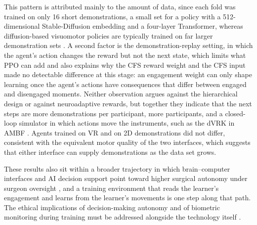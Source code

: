 \documentclass[utf8]{frontiers_suppmat}
\begin{document}
This pattern is attributed mainly to the amount of data, since each fold was trained on only 16 short demonstrations, a small set for a policy with a 512-dimensional Stable-Diffusion embedding and a four-layer Transformer, whereas diffusion-based visuomotor policies are typically trained on far larger demonstration sets \cite{chi2023diffusion,kim2024srt}. A second factor is the demonstration-replay setting, in which the agent's action changes the reward but not the next state, which limits what PPO can add and also explains why the CFS reward weight and the CFS input made no detectable difference at this stage: an engagement weight can only shape learning once the agent's actions have consequences that differ between engaged and disengaged moments. Neither observation argues against the hierarchical design or against neuroadaptive rewards, but together they indicate that the next steps are more demonstrations per participant, more participants, and a closed-loop simulator in which actions move the instruments, such as the dVRK in AMBF \cite{Munawar2021}. Agents trained on VR and on 2D demonstrations did not differ, consistent with the equivalent motor quality of the two interfaces, which suggests that either interface can supply demonstrations as the data set grows.

These results also sit within a broader trajectory in which brain--computer interfaces and AI decision support point toward higher surgical autonomy under surgeon oversight \cite{Guger2009Brain,Hochberg2006Neuronal,long2022,qian2019}, and a training environment that reads the learner's engagement and learns from the learner's movements is one step along that path. The ethical implications of decision-making autonomy and of biometric monitoring during training must be addressed alongside the technology itself \cite{Medaglia2020,Fosch-Villaronga2023,randell2015impact}.
\end{document}
